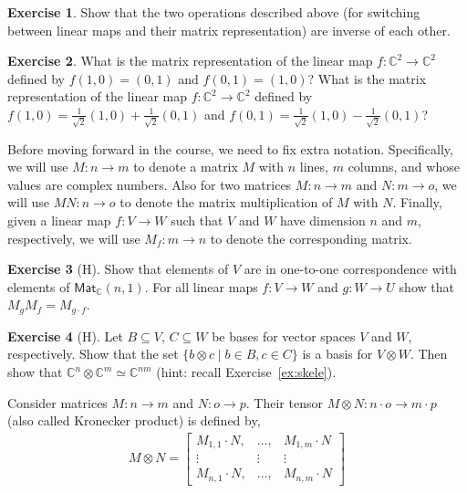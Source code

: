\documentclass[a4paper, 11pt]{article}
\newcommand{\complex}{\mathbb{C}}
\theoremstyle{definition}
\newtheorem{exercise}{Exercise}
\begin{document}
\begin{exercise}
  Show that the two operations described above (for switching between
  linear maps and their matrix representation) are inverse of each
  other.
\end{exercise}


\begin{exercise}
  What is the matrix representation of the linear map
  $f : \complex^2 \to \complex^2$ defined by $f(1,0) = (0,1)$ and
  $f(0,1) = (1,0)$? What is the matrix representation of the linear
  map $f : \complex^2 \to \complex^2$ defined by
  $f(1,0) = \frac{1}{\sqrt{2}}(1,0) + \frac{1}{\sqrt{2}}(0,1)$ and
  $f(0,1) = \frac{1}{\sqrt{2}}(1,0) - \frac{1}{\sqrt{2}}(0,1)$?
\end{exercise}

Before moving forward in the course, we need to fix extra
notation. Specifically, we will use $M : n \to m$ to denote a matrix
$M$ with $n$ lines, $m$ columns, and whose values are complex
numbers. Also for two matrices $M : n \to m$ and $N : m \to o$, we
will use $M N : n \to o$ to denote the matrix multiplication of $M$
with $N$. Finally, given a linear map $f : V \to W$ such that $V$ and
$W$ have dimension $n$ and $m$, respectively, we will use
$M_f : m \to n$ to denote the corresponding matrix.
  
\begin{exercise}[H]
  Show that elements of $ V$ are in one-to-one correspondence with
  elements of $\mathsf{Mat}_\complex(n,1)$. For all linear maps
  $f : V \to W$ and $g : W \to U$ show that
  $M_g M_f = M_{g \cdot f}$.
\end{exercise}


\begin{exercise}[H]
  Let $B \subseteq V$, $C \subseteq W$ be bases for vector spaces $V$
  and $W$, respectively.  Show that the set
  $\{ b \otimes c \mid b \in B, c \in C \}$ is a basis for
  $V \otimes W$. Then show that
  $\complex^n \otimes \complex^m \simeq \complex^{n m}$
  (hint: recall Exercise~\ref{ex:skele}).
\end{exercise}

Consider matrices $M : n \to m$ and $N : o \to p$. Their tensor
$M \otimes N : n \cdot o \to m \cdot p$ (also called Kronecker
product) is defined by,
\begin{align*}
  M \otimes N =
  \begin{bmatrix}
    M_{1,1} \cdot N, & \dots , &  M_{1,m} \cdot N \\
    \vdots & \vdots & \vdots \\
    M_{n,1} \cdot N, & \dots , &  M_{n,m} \cdot N
  \end{bmatrix}
\end{align*}
\end{document}
